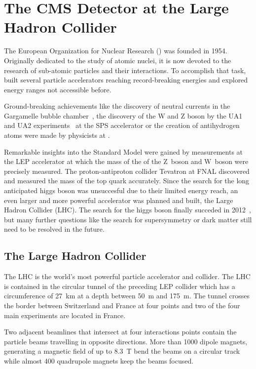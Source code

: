 
\chapter{The CMS Detector at the Large Hadron Collider}

The European Organization for Nuclear Research (\CERN) was founded in 1954.
Originally dedicated to the study of atomic nuclei, it is now devoted to the
research of sub-atomic particles and their interactions. To accomplish that
task, \CERN built several particle accelerators reaching record-breaking
energies and explored energy ranges not accessible before.

Ground-breaking achievements like the discovery of neutral currents in the
Gargamelle bubble chamber~\cite{Hasert:1973ff}, the discovery of the W and Z
boson by the UA1 and UA2 experiments~\cite{Arnison:1983rp} at the SPS
accelerator or the creation of antihydrogen atoms were made by physicists at
\CERN.

Remarkable insights into the Standard Model were gained by measurements at the
LEP accelerator at which the mass of the of the Z~boson and W~boson were
precisely measured. The proton-antiproton collider Tevatron at FNAL discovered
and measured the mass of the top quark accurately. Since the search for the long
anticipated higgs boson was unsuccesful due to their limited energy reach, an even
larger and more powerful accelerator was planned and built, the Large Hadron
Collider (LHC). The search for the higgs boson finally succeded in
2012~\cite{Chatrchyan:2012xdj}, but many further questions like the search for
supersymmetry or dark matter still need to be resolved in the future.

\section{The Large Hadron Collider}

The LHC is the world's most powerful particle accelerator and collider. The LHC
is contained in the circular tunnel of the preceding LEP collider which has a
circumference of \SI{27}{\kilo \meter} at a depth between \SI{50}{\meter} and
\SI{175}{\meter}.  The tunnel crosses the border between Switzerland and France
at four points and two of the four main experiments are located in France. 

Two adjacent beamlines that intersect at four interactions points contain the
particle beams travelling in opposite directions. More than 1000 dipole magnets,
generating a magnetic field of up to \SI{8.3}{\tesla} bend the beams on
a circular track while almost 400 quadrupole magnets keep the beams focused. 

